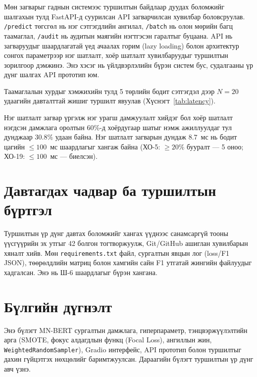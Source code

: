 Мөн загварыг гаднын системээс туршилтын байдлаар дуудах боломжийг шалгахын
тулд FastAPI-д суурилсан API загварчилсан хувилбар боловсруулав.
\texttt{/predict} төгсгөл нь нэг сэтгэгдлийн ангилал, \texttt{/batch} нь олон
мөрийн багц таамаглал, \texttt{/audit} нь аудитын маягийн нэгтгэсэн гаралтыг
буцаана. API нь загваруудыг шаардлагатай үед ачаалах горим (lazy loading) болон
архитектур сонгох параметрээр нэг шатлалт, хоёр шатлалт хувилбаруудыг туршилтын
зорилгоор дэмжинэ. Энэ хэсэг нь үйлдвэрлэлийн бүрэн систем бус, судалгааны үр
дүнг шалгах API прототип юм.

Таамаглалын хурдыг хэмжихийн тулд 5 төрлийн бодит сэтгэгдэл дээр $N{=}20$
удаагийн давталттай жишиг туршилт явуулав
(Хүснэгт~\ref{tab:latency}).

\begin{table}[H]
\centering
\caption{Таамаглалын хурдны хэмжилт}
\label{tab:latency}
\end{table}

Нэг шатлалт загвар үргэлж нэг урагш дамжуулалт хийдэг бол хоёр шатлалт нэгдсэн дамжлага
оролтын $60\%$-д хоёрдугаар шатыг нэмж ажиллуулдаг тул дунджаар $30.8\%$ удаан
байна. Нэг шатлалт загварын дундаж $8.7$~мс нь бодит цагийн ${\leq}100$~мс
шаардлагыг хангаж байна (ХО-5: ${\geq}20\%$ бууралт --- 5 оноо; ХО-19:
${\leq}100$~мс --- биелсэн).

\section{Давтагдах чадвар ба туршилтын бүртгэл}

Туршилтын үр дүнг давтах боломжийг хангах үүднээс санамсаргүй тооны үүсгүүрийн
эх утгыг 42 болгон тогтворжуулж, Git/GitHub ашиглан хувилбарын хяналт хийв. Мөн
\texttt{requirements.txt} файл, сургалтын явцын лог (loss/F1 JSON),
төөрөлдлийн матриц болон хамгийн сайн F1 утгатай жингийн файлуудыг хадгалсан.
Энэ нь Ш-6 шаардлагыг бүрэн хангана.
\section{Бүлгийн дүгнэлт}

Энэ бүлэгт MN-BERT сургалтын дамжлага, гиперпараметр, тэнцвэржүүлэлтийн арга
(SMOTE, фокус алдагдлын функц (Focal Loss), ангиллын жин,
\texttt{WeightedRandomSampler}), Gradio интерфейс, API прототип болон туршилтыг
дахин гүйцэтгэх нөхцөлийг баримтжуулсан. Дараагийн бүлэгт туршилтын үр дүнг
авч үзнэ.
